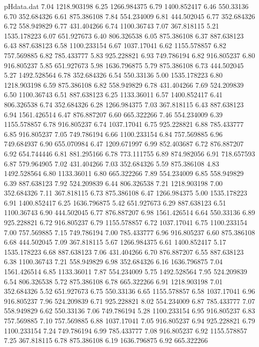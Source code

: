 \begin{filecontents}{pHdata.dat}
7.04	1218.903198
6.25	1266.984375
6.79	1400.852417
6.46	550.33136
6.70	352.684326
6.61	875.386108
7.84	554.234009
6.81	444.502045
6.77	352.684326
6.72	558.949829
6.77	431.404266
6.74	1100.36743
7.07	367.818115
5.21	1535.178223
6.07	651.927673
6.40	806.326538
6.05	875.386108
6.37	887.638123
6.43	887.638123
6.58	1100.233154
6.67	1037.17041
6.62	1155.578857
6.82	757.569885
6.82	785.433777
5.83	925.228821
6.93	749.786194
6.82	916.805237
6.80	916.805237
5.85	651.927673
5.98	1636.796875
5.79	875.386108
6.73	444.502045
5.27	1492.528564
6.78	352.684326
6.54	550.33136
5.00	1535.178223
6.80	1218.903198
6.59	875.386108
6.82	558.949829
6.78	431.404266
7.69	524.209839
6.50	1100.36743
6.51	887.638123
6.25	1133.36011
6.57	1400.852417
6.41	806.326538
6.74	352.684326
6.28	1266.984375
7.03	367.818115
6.43	887.638123
6.94	1561.426514
6.47	876.887207
6.60	665.322266
7.46	554.234009
6.39	1155.578857
6.78	916.805237
6.74	1037.17041
6.75	925.228821
6.88	785.433777
6.85	916.805237
7.05	749.786194
6.66	1100.233154
6.84	757.569885
6.96	749.684937
6.90	655.070984
6.47	1209.671997
6.99	852.403687
6.72	876.887207
6.92	654.744446
6.81	881.295166
6.78	773.111755
6.89	874.982056
6.91	718.657593
6.87	579.964905
7.02	431.404266
7.03	352.684326
5.59	875.386108
4.83	1492.528564
6.80	1133.36011
6.80	665.322266
7.89	554.234009
6.85	558.949829
6.39	887.638123
7.92	524.209839
6.44	806.326538
7.21	1218.903198
7.00	352.684326
7.11	367.818115
6.73	875.386108
6.47	1266.984375
5.00	1535.178223
6.91	1400.852417
6.25	1636.796875
5.42	651.927673
6.29	887.638123
6.51	1100.36743
6.90	444.502045
6.77	876.887207
6.98	1561.426514
6.64	550.33136
6.89	925.228821
6.72	916.805237
6.79	1155.578857
6.72	1037.17041
6.75	1100.233154
7.00	757.569885
7.15	749.786194
7.00	785.433777
6.96	916.805237
6.60	875.386108
6.68	444.502045
7.09	367.818115
5.67	1266.984375
6.61	1400.852417
5.17	1535.178223
6.68	887.638123
7.06	431.404266
6.70	876.887207
6.55	887.638123
6.38	1100.36743
7.21	558.949829
6.98	352.684326
6.16	1636.796875
7.04	1561.426514
6.85	1133.36011
7.87	554.234009
5.75	1492.528564
7.95	524.209839
6.54	806.326538
5.72	875.386108
6.78	665.322266
6.91	1218.903198
7.01	352.684326
5.52	651.927673
6.75	550.33136
6.65	1155.578857
6.58	1037.17041
6.96	916.805237
7.96	524.209839
6.71	925.228821
8.02	554.234009
6.87	785.433777
7.07	558.949829
6.62	550.33136
7.06	749.786194
5.28	1100.233154
6.95	916.805237
6.83	757.569885
7.10	757.569885
6.88	1037.17041
7.05	916.805237
6.94	925.228821
6.79	1100.233154
7.24	749.786194
6.99	785.433777
7.08	916.805237
6.92	1155.578857
7.25	367.818115
6.78	875.386108
6.19	1636.796875
6.92	665.322266

\end{filecontents}
